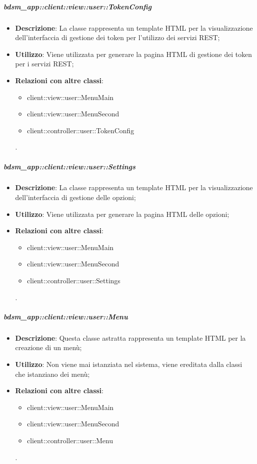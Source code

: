 		\subparagraph{bdsm\_app::client::view::user::TokenConfig} %
		\label{subp:bdsm_app_client_view_user_tokenconfig}
			\begin{itemize}
				\item \textbf{Descrizione}: La classe rappresenta un template HTML per la visualizzazione dell'interfaccia di gestione dei token per l'utilizzo dei servizi REST;
				\item \textbf{Utilizzo}: Viene utilizzata per generare la pagina HTML di gestione dei token per i servizi REST;
				\item \textbf{Relazioni con altre classi}: 		
					\begin{itemize}
						\item client::view::user::MenuMain
						\item client::view::user::MenuSecond
						\item client::controller::user::TokenConfig					
					\end{itemize}.
			\end{itemize}

		\subparagraph{bdsm\_app::client::view::user::Settings} %
		\label{subp:bdsm_app_client_view_user_settings}
			\begin{itemize}
				\item \textbf{Descrizione}: La classe rappresenta un template HTML per la visualizzazione dell'interfaccia di gestione delle opzioni;
				\item \textbf{Utilizzo}: Viene utilizzata per generare la pagina HTML delle opzioni;
				\item \textbf{Relazioni con altre classi}: 		
					\begin{itemize}
						\item client::view::user::MenuMain
						\item client::view::user::MenuSecond
						\item client::controller::user::Settings
					\end{itemize}.
			\end{itemize}

		\subparagraph{bdsm\_app::client::view::user::Menu} %
		\label{subp:bdsm_app_client_view_user_menu}
			\begin{itemize}
				\item \textbf{Descrizione}: Questa classe astratta rappresenta un template HTML per la creazione di un menù;
				\item \textbf{Utilizzo}: Non viene mai istanziata nel sistema, viene ereditata dalla classi che istanziano dei menù;
				\item \textbf{Relazioni con altre classi}: 		
					\begin{itemize}
						\item client::view::user::MenuMain
						\item client::view::user::MenuSecond
						\item client::controller::user::Menu							
					\end{itemize}.
			\end{itemize}

